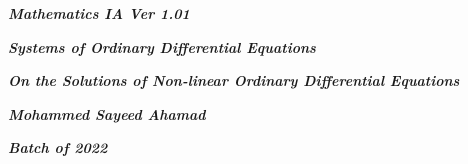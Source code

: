 

\begin{titlepage}
    \begin{center}
        \vspace*{1cm}
            
        \date{}
            
        \huge
            
        \textit{\textbf{Mathematics IA Ver 1.01}}
            
        \vspace{0.25cm}
            
        \hline
            
        \vspace{2.5cm}
            
        \textit{\textbf{Systems of Ordinary Differential Equations}}
            
        \vspace{1cm}
            
        \LARGE
            
        \textit{\textbf{On the Solutions of Non-linear Ordinary Differential Equations}}
            
        \vspace{2.5cm}
            
        \Large
            
        \textit{\textbf{Mohammed Sayeed Ahamad}}
            
        \vspace{4cm}
            
        \Large
            
        \textit{\textbf{Batch of 2022}}
            
        \vspace{0.25cm}
            
        \hline
           
            
    \end{center}
\end{titlepage}



